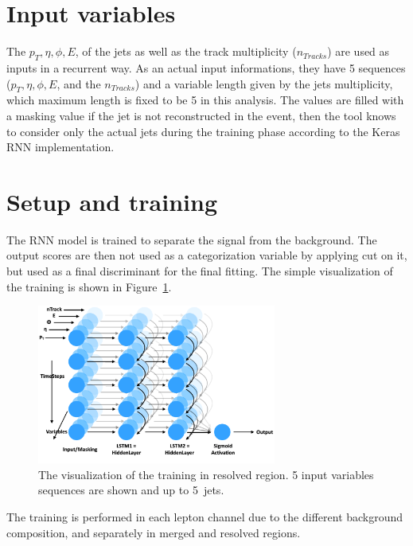 \section{Input variables}
The $p_T, \eta, \phi, E$, of the jets as well as the track multiplicity ($n_{Tracks}$) are used as inputs in a recurrent way. As an actual input informations, they have 5 sequences ($p_T, \eta, \phi, E$, and the $n_{Tracks}$) and a variable length given by the jets multiplicity, which maximum length is fixed to be 5 in this analysis. The values are filled with a masking value if the jet is not reconstructed in the event, then the tool knows to consider only the actual jets during the training phase according to the Keras RNN implementation. 

\section{Setup and training}
The RNN model is trained to separate the signal from the background. The output scores are then not used as a categorization variable by applying cut on it, but used as a final discriminant for the final fitting. The simple visualization of the training is shown in Figure~\ref{fig:simplenode}.
\begin{figure}[H]
    \centering
    \includegraphics[width=0.7\textwidth]{figures/simplenode}
    \caption{The visualization of the training in resolved region. 5 input variables sequences are shown and up to 5~jets.
    }
    \label{fig:simplenode}
\end{figure}
The training is performed in each lepton channel due to the different background composition, and separately in merged and resolved regions.

